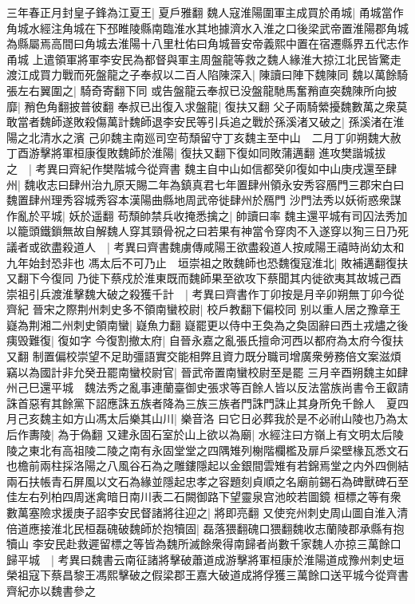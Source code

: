 三年春正月封皇子鋒為江夏王|{
	夏戶雅翻}
魏人寇淮陽圍軍主成買於甬城|{
	甬城當作角城水經注角城在下邳睢陵縣南臨淮水其地據濟水入淮之口後梁武帝置淮陽郡角城為縣屬焉高間曰角城去淮陽十八里杜佑曰角城晉安帝義熙中置在宿遷縣界五代志作甬城}
上遣領軍將軍李安民為都督與軍主周盤龍等救之魏人緣淮大掠江北民皆驚走渡江成買力戰而死盤龍之子奉叔以二百人陷陳深入|{
	陳讀曰陣下魏陳同}
魏以萬餘騎張左右翼圍之|{
	騎奇寄翻下同}
或告盤龍云奉叔已没盤龍馳馬奮矟直突魏陳所向披靡|{
	矟色角翻披普彼翻}
奉叔已出復入求盤龍|{
	復扶又翻}
父子兩騎縈擾魏數萬之衆莫敢當者魏師遂敗殺傷萬計魏師退李安民等引兵追之戰於孫溪渚又破之|{
	孫溪渚在淮陽之北清水之濱}
己卯魏主南廵司空苟頹留守丁亥魏主至中山　二月丁卯朔魏大赦　丁酉游擊將軍桓康復敗魏師於淮陽|{
	復扶又翻下復如同敗蒲邁翻}
進攻樊諧城拔之　|{
	考異曰齊紀作樊階城今從齊書}
魏主自中山如信都癸卯復如中山庚戌還至肆州|{
	魏收志曰肆州治九原天賜二年為鎮真君七年置肆州領永安秀容鴈門三郡宋白曰魏置肆州理秀容城秀容本漢陽曲縣地周武帝徙肆州於鴈門}
沙門法秀以妖術惑衆謀作亂於平城|{
	妖於遥翻}
苟頹帥禁兵收掩悉擒之|{
	帥讀曰率}
魏主還平城有司囚法秀加以籠頭鐵鎻無故自解魏人穿其頸骨祝之曰若果有神當令穿肉不入遂穿以狥三日乃死議者或欲盡殺道人　|{
	考異曰齊書魏虜傳咸陽王欲盡殺道人按咸陽王禧時尚幼太和九年始封恐非也}
馮太后不可乃止　垣崇祖之敗魏師也恐魏復寇淮北|{
	敗補邁翻復扶又翻下今復同}
乃徙下蔡戍於淮東既而魏師果至欲攻下蔡聞其内徙欲夷其故城己酉崇祖引兵渡淮擊魏大破之殺獲千計　|{
	考異曰齊書作丁卯按是月辛卯朔無丁卯今從齊紀}
晉宋之際荆州刺史多不領南蠻校尉|{
	校戶教翻下偏校同}
别以重人居之豫章王嶷為荆湘二州刺史領南蠻|{
	嶷魚力翻}
嶷罷更以侍中王奐為之奐固辭曰西土戎燼之後痍毁難復|{
	復如字}
今復割撤太府|{
	自晉永嘉之亂張氏擅命河西以都府為太府今復扶又翻}
制置偏校崇望不足助彊語實交能相弊且資力既分職司增廣衆勞務倍文案滋煩竊以為國計非允癸丑罷南蠻校尉官|{
	晉武帝置南蠻校尉至是罷}
三月辛酉朔魏主如肆州己巳還平城　魏法秀之亂事連蘭臺御史張求等百餘人皆以反法當族尚書令王叡請誅首惡宥其餘黨下詔應誅五族者降為三族三族者門誅門誅止其身所免千餘人　夏四月己亥魏主如方山馮太后樂其山川|{
	樂音洛}
曰它日必葬我於是不必祔山陵也乃為太后作夀陵|{
	為于偽翻}
又建永固石室於山上欲以為廟|{
	水經注曰方嶺上有文明太后陵陵之東北有高祖陵二陵之南有永固堂堂之四隅雉列榭階欄檻及扉戶梁壁椽瓦悉文石也檐前兩柱採洛陽之八風谷石為之雕鏤隱起以金銀間雲雉有若錦焉堂之内外四側結兩石扶帳青石屏風以文石為緣並隱起忠孝之容題刻貞順之名廟前錫石為碑獸碑石至佳左右列柏四周迷禽暗日南川表二石闕御路下望靈泉宫池皎若圖鏡}
桓標之等有衆數萬塞險求援庚子詔李安民督諸將往迎之|{
	將即亮翻}
又使兖州刺史周山圖自淮入清倍道應接淮北民桓磊磈破魏師於抱犢固|{
	磊落猥翻磈口猥翻魏收志蘭陵郡承縣有抱犢山}
李安民赴救遲留標之等皆為魏所滅餘衆得南歸者尚數千家魏人亦掠三萬餘口歸平城　|{
	考異曰魏書云南征諸將擊破蕭道成游擊將軍桓康於淮陽道成豫州刺史垣榮祖寇下蔡昌黎王馮熙擊破之假梁郡王嘉大破道成將俘獲三萬餘口送平城今從齊書齊紀亦以魏書參之}
